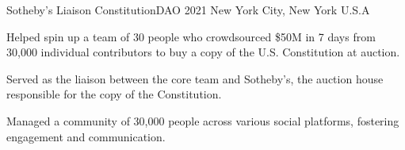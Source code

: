 \begin{cventries}
  \cventry
    {Sotheby's Liaison} %
    {ConstitutionDAO} %
    {2021} %
    {New York City, New York U.S.A} %
    {
      \begin{cvitems} %
        \item {Helped spin up a team of 30 people who crowdsourced \$50M in 7 days from 30,000 individual contributors to buy a copy of the U.S. Constitution at auction.}
        \item {Served as the liaison between the core team and Sotheby's, the auction house responsible for the copy of the Constitution.}
        \item {Managed a community of 30,000 people across various social platforms, fostering engagement and communication.}
      \end{cvitems}
    }

\end{cventries}
